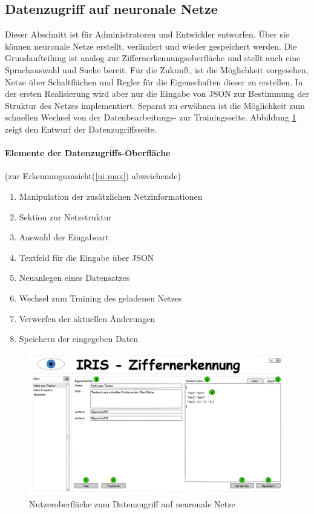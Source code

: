 \subsection{Datenzugriff auf neuronale Netze}
Dieser Abschnitt ist für Administratoren und Entwickler entworfen. Über sie können neuronale Netze erstellt, verändert und wieder gespeichert werden. Die Grundaufteilung ist analog zur Ziffernerkennungsoberfläche und stellt auch eine Sprachauswahl und Suche bereit. Für die Zukunft, ist die Möglichkeit vorgesehen, Netze über Schaltflächen und Regler für die Eigenschaften dieser zu erstellen. In der ersten Realisierung wird aber nur die Eingabe von JSON zur Bestimmung der Struktur des Netzes implementiert. Separat zu erwähnen ist die Möglichkeit zum schnellen Wechsel von der  Datenbearbeitungs- zur Trainingsseite. Abbildung \ref{ui-crud} zeigt den Entwurf der Datenzugriffsseite.

 \paragraph{Elemente der Datenzugriffs-Oberfläche} (zur Erkennungsansicht(\ref{ui-max}) abweichende)
 \begin{enumerate}
 	\item Manipulation der zusätzlichen Netzinformationen
 	\item Sektion zur Netzstruktur
 	\item Auswahl der Eingabeart
 	\item Textfeld für die Eingabe über JSON
 	\item Neuanlegen eines Datensatzes
 	\item Wechsel zum Training des geladenen Netzes
 	\item Verwerfen der aktuellen Änderungen
 	\item Speichern der eingegeben Daten
 \end{enumerate}

\begin{figure}[H]
	
	\centering
	\includegraphics[width=1\textwidth]{Abbildungen/UI-Mocks/CRUD-Ui.png}
	\caption{Nutzeroberfläche zum Datenzugriff auf neuronale Netze}
	\label{ui-crud}
\end{figure}

